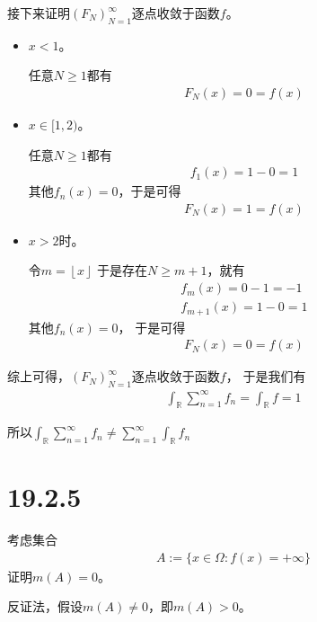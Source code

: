 \documentclass{article}
\begin{document}
接下来证明$(F_N)_{N = 1}^\infty$逐点收敛于函数$f$。

\begin{itemize}
  \item $x < 1$。

        任意$N \geq 1$都有
        \begin{align*}
          F_N(x) = 0 = f(x)
        \end{align*}

  \item $x \in [1, 2)$。

        任意$N \geq 1$都有
        \begin{align*}
          f_1(x) = 1 - 0 = 1
        \end{align*}
        其他$f_n(x) = 0$，于是可得
        \begin{align*}
          F_N(x) = 1 = f(x)
        \end{align*}

  \item $x > 2$时。

        令$m = \left\lfloor x \right\rfloor$
        于是存在$N \geq m + 1$，就有
        \begin{align*}
          f_m(x) = 0 - 1 = -1 \\
          f_{m + 1}(x) = 1 - 0 = 1
        \end{align*}
        其他$f_n(x) = 0$，
        于是可得
        \begin{align*}
          F_N(x) = 0 = f(x)
        \end{align*}
\end{itemize}

综上可得，$(F_N)_{N = 1}^\infty$逐点收敛于函数$f$，
于是我们有
\begin{align*}
  \int_{\mathbb{R}} \sum\limits_{n=1}^\infty f_n = \int_{\mathbb{R}} f = 1
\end{align*}

所以$\int_{\mathbb{R}} \sum\limits_{n=1}^\infty f_n \neq \sum \limits_{n = 1}^\infty \int_{\mathbb{R}} f_n$

\section*{19.2.5}

考虑集合
\begin{align*}
  A := \{x \in \Omega: f(x) = +\infty\}
\end{align*}
证明$m(A) = 0$。

反证法，假设$m(A) \neq 0$，即$m(A) > 0$。
\end{document}
